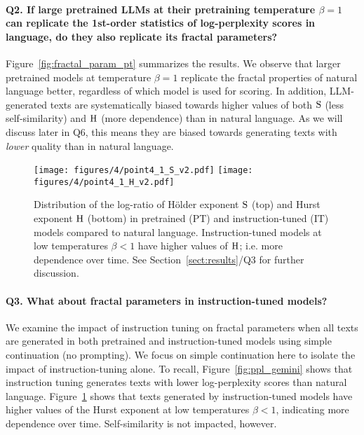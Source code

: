 \paragraph{Q2. If large pretrained LLMs at their pretraining temperature $\beta=1$ can replicate the 1st-order statistics of log-perplexity scores in language, do they also replicate its fractal parameters?}
 Figure~\ref{fig:fractal_param_pt} summarizes the results. We observe that larger pretrained models at temperature $\beta=1$ replicate the fractal properties of natural language better, regardless of which model is used for scoring. In addition, LLM-generated texts are systematically biased towards higher values of both $\mathrm{S}$ (less self-similarity) and $\mathrm{H}$ (more dependence) than in natural language. As we will discuss later in Q6, this means they are biased towards generating texts with \emph{lower} quality than in natural language.

\begin{figure*}[t]
    \centering
    \texttt{[image: figures/4/point4\_1\_S\_v2.pdf]}
    \texttt{[image: figures/4/point4\_1\_H\_v2.pdf]}
    \caption{Distribution of the log-ratio of H\"older exponent $\mathrm{S}$ (top) and Hurst exponent $\mathrm{H}$ (bottom) in pretrained (PT) and instruction-tuned (IT) models compared to natural language. Instruction-tuned models at low temperatures $\beta<1$ have higher values of $\mathrm{H}$; i.e. more dependence over time. See Section~\ref{sect:results}/Q3 for further discussion.}
    \label{fig:pt_vs_it_s_h}
\end{figure*}

\paragraph{Q3. What about fractal parameters in instruction-tuned models?}
We examine the impact of instruction tuning on fractal parameters when all texts are generated in both pretrained and instruction-tuned models using simple continuation (no prompting). We focus on simple continuation here to isolate the impact of instruction-tuning alone. To recall, Figure~\ref{fig:ppl_gemini} shows that instruction tuning generates texts with lower log-perplexity scores than natural language. Figure~\ref{fig:pt_vs_it_s_h} shows that  texts generated by instruction-tuned models have higher values of the Hurst exponent at low temperatures $\beta<1$, indicating more dependence over time. Self-similarity is not impacted, however.

